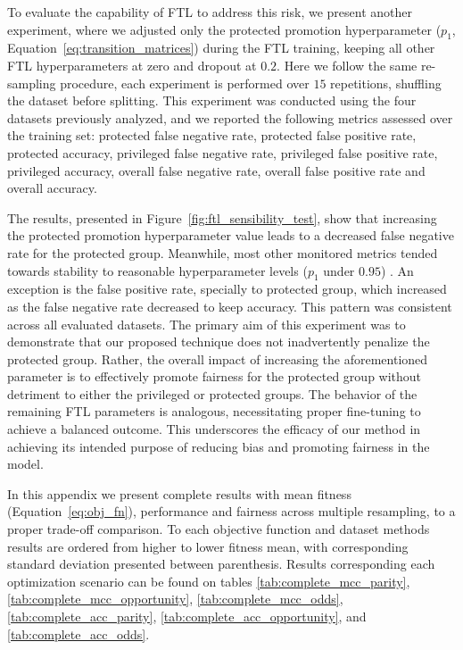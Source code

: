 To evaluate the capability of FTL to address this risk, we present another experiment, where we adjusted only the protected promotion hyperparameter ($p_1$,  Equation~\ref{eq:transition_matrices}) during the FTL training, keeping all other FTL hyperparameters at zero and dropout at $0.2$. Here we follow the same re-sampling procedure, each experiment is performed over $15$ repetitions, shuffling the dataset before splitting. This experiment was conducted using the four datasets previously analyzed, and we reported the following metrics assessed over the training set: protected false negative rate, protected false positive rate, protected accuracy, privileged false negative rate, privileged false positive rate, privileged accuracy, overall false negative rate, overall false positive rate and overall accuracy.

The results, presented in Figure~\ref{fig:ftl_sensibility_test}, show that increasing the protected promotion hyperparameter value leads to a decreased false negative rate for the protected group. Meanwhile, most other monitored metrics tended towards stability to reasonable hyperparameter levels ($p_1$ under $0.95$) . An exception is the false positive rate, specially to protected group, which increased as the false negative rate decreased to keep accuracy. This pattern was consistent across all evaluated datasets. The primary aim of this experiment was to demonstrate that our proposed technique does not inadvertently penalize the protected group. Rather, the overall impact of increasing the aforementioned parameter is to effectively promote fairness for the protected group without detriment to either the privileged or protected groups. The behavior of the remaining FTL parameters is analogous, necessitating proper fine-tuning to achieve a balanced outcome. This underscores the efficacy of our method in achieving its intended purpose of reducing bias and promoting fairness in the model.



\setcounter{table}{0}
\renewcommand{\thetable}{A.\arabic{table}}

In this appendix we present complete results with mean fitness (Equation~\ref{eq:obj_fn}), performance and fairness across multiple resampling, to a proper trade-off comparison. To each objective function and dataset methods results are ordered from higher to lower fitness mean, with corresponding standard deviation presented between parenthesis. Results corresponding each optimization scenario can be found on tables \ref{tab:complete_mcc_parity}, \ref{tab:complete_mcc_opportunity}, \ref{tab:complete_mcc_odds}, \ref{tab:complete_acc_parity}, \ref{tab:complete_acc_opportunity}, and \ref{tab:complete_acc_odds}.


